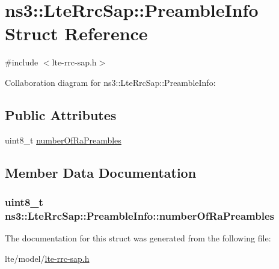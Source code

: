 \hypertarget{structns3_1_1LteRrcSap_1_1PreambleInfo}{}\section{ns3\+:\+:Lte\+Rrc\+Sap\+:\+:Preamble\+Info Struct Reference}
\label{structns3_1_1LteRrcSap_1_1PreambleInfo}


{\ttfamily \#include $<$lte-\/rrc-\/sap.\+h$>$}



Collaboration diagram for ns3\+:\+:Lte\+Rrc\+Sap\+:\+:Preamble\+Info\+:
\subsection*{Public Attributes}
\begin{DoxyCompactItemize}
\item 
uint8\+\_\+t \hyperlink{structns3_1_1LteRrcSap_1_1PreambleInfo_a295d49dec422b0663f9e3245ce7b3348}{number\+Of\+Ra\+Preambles}
\end{DoxyCompactItemize}


\subsection{Member Data Documentation}
\subsubsection[{\texorpdfstring{number\+Of\+Ra\+Preambles}{numberOfRaPreambles}}]{\setlength{\rightskip}{0pt plus 5cm}uint8\+\_\+t ns3\+::\+Lte\+Rrc\+Sap\+::\+Preamble\+Info\+::number\+Of\+Ra\+Preambles}\hypertarget{structns3_1_1LteRrcSap_1_1PreambleInfo_a295d49dec422b0663f9e3245ce7b3348}{}\label{structns3_1_1LteRrcSap_1_1PreambleInfo_a295d49dec422b0663f9e3245ce7b3348}


The documentation for this struct was generated from the following file\+:\begin{DoxyCompactItemize}
\item 
lte/model/\hyperlink{lte-rrc-sap_8h}{lte-\/rrc-\/sap.\+h}\end{DoxyCompactItemize}
